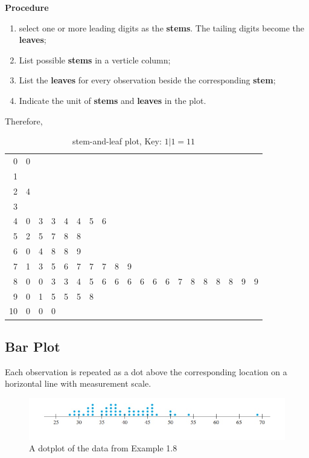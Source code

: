 \textbf{Procedure}

\begin{enumerate}
  \item select one or more leading digits as the \textbf{stems}. The tailing digits become the \textbf{leaves};
  \item List possible \textbf{stems} in a verticle column;
  \item List the \textbf{leaves} for every observation beside the corresponding \textbf{stem};
  \item Indicate the unit of \textbf{stems} and \textbf{leaves} in the plot.
\end{enumerate}

Therefore,
\begin{table}[H]
  \centering
  \caption{stem-and-leaf plot, Key: $1 | 1= 11$}
    \begin{tabular}{r|lllllllllllllllllll}
    0     & 0   \\
    1     \\
    2     & 4   \\
    3     \\
    4     & 0   & 3   & 3   & 4   & 4   & 5   & 6  \\
    5     & 2   & 5   & 7   & 8   & 8  \\
    6     & 0   & 4   & 8   & 8   & 9\\
    7     & 1   & 3   & 5   & 6   & 7   & 7   & 7   & 8   & 9   \\
    8     & 0   & 0   & 3   & 3   & 4   & 5   & 6   & 6   & 6   & 6   & 6   & 6   & 7   & 8   & 8   & 8   & 8   & 9   & 9  \\
    9     & 0   & 1   & 5   & 5   & 5   & 8   \\
    10    & 0   & 0   & 0 \\
    \end{tabular}
\end{table}


\subsection{Bar Plot}
Each observation is repeated as a dot above the corresponding location on a horizontal line with measurement scale.

\begin{figure}[htbp]
\centering
\includegraphics{figures/barplot.jpg}
\caption{A dotplot of the data from Example 1.8}
\label{fig:1}
\end{figure}


